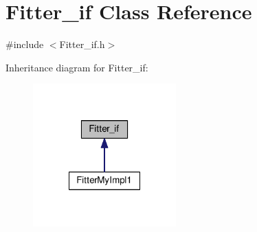 \hypertarget{class_fitter__if}{\section{Fitter\-\_\-if Class Reference}
\label{class_fitter__if}
}


{\ttfamily \#include $<$Fitter\-\_\-if.\-h$>$}



Inheritance diagram for Fitter\-\_\-if\-:\nopagebreak
\begin{figure}[H]
\begin{center}
\leavevmode
\includegraphics[width=156pt]{class_fitter__if__inherit__graph}
\end{center}
\end{figure}
